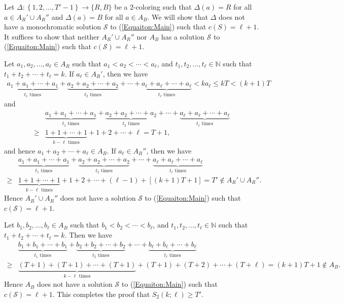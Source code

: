 \documentclass[11pt]{article}
\theoremstyle{definition}
\begin{document}
Let $\Delta:\left\{1,2,\ldots,T'-1\right\}\to\{R,B\}$ be a $2$-coloring such that $\Delta(a)=R$ for all $a\in A_R'\cup A_R''$ and $\Delta(a)=B$ for all $a\in A_B$. We will show that $\Delta$ does not have a monochromatic solution $\mathcal{S}$ to (\ref{Equaiton:Main}) such that $c(S)=\ell+1$. It suffices to show that neither $A_R'\cup A_R''$ nor $A_B$ has a solution $\mathcal{S}$ to (\ref{Equaiton:Main}) such that $c(\mathcal{S})=\ell+1$. 

Let $a_1,a_2,\ldots,a_{\ell}\in A_R$ such that $a_1<a_2<\cdots<a_{\ell}$, and $t_1,t_2,\ldots,t_{\ell}\in\mathbb{N}$ such that $t_1+t_2+\cdots+t_\ell=k$. If $a_\ell\in A_R'$, then we have
\[
\begin{split}
\underbrace{a_1+a_1+\cdots+a_1}_{t_1\text{ times}}+\underbrace{a_2+a_2+\cdots+a_2}_{t_2\text{ times}}+\cdots+\underbrace{a_\ell+a_\ell+\cdots+a_\ell}_{t_\ell\text{ times}}<ka_\ell\leq kT<(k+1)T
\end{split}
\]
and
\[
\begin{split}
&\underbrace{a_1+a_1+\cdots+a_1}_{t_1\text{ times}}+\underbrace{a_2+a_2+\cdots+a_2}_{t_2\text{ times}}+\cdots+\underbrace{a_\ell+a_\ell+\cdots+a_\ell}_{t_\ell\text{ times}}\\\geq&\underbrace{1+1+\cdots+1}_{k-\ell\text{ times}}+1+2+\cdots+\ell=T+1,
\end{split}
\]
and hence $a_1+a_2+\cdots+a_{\ell}\in A_B$. If $a_\ell\in A_R''$, then we have
\[
\begin{split}
&\underbrace{a_1+a_1+\cdots+a_1}_{t_1\text{ times}}+\underbrace{a_2+a_2+\cdots+a_2}_{t_2\text{ times}}+\cdots+\underbrace{a_\ell+a_\ell+\cdots+a_\ell}_{t_\ell\text{ times}}\\\geq&\underbrace{1+1+\cdots+1}_{k-\ell\text{ times}}+1+2+\cdots+(\ell-1)+[(k+1)T+1]=T'\notin A_R'\cup A_R''.
\end{split}
\]
Hence $A_R'\cup A_R''$ does not have a solution $\mathcal{S}$ to (\ref{Equaiton:Main}) such that $c(\mathcal{S})=\ell+1$. 

Let $b_1,b_2,\ldots,b_{\ell}\in A_B$ such that $b_1<b_2<\cdots<b_{\ell}$, and $t_1,t_2,\ldots,t_{\ell}\in\mathbb{N}$ such that $t_1+t_2+\cdots+t_\ell=k$. Then we have
\[
\begin{split}
&\underbrace{b_1+b_1+\cdots+b_1}_{t_1\text{ times}}+\underbrace{b_2+b_2+\cdots+b_2}_{t_2\text{ times}}+\cdots+\underbrace{b_\ell+b_\ell+\cdots+b_\ell}_{t_\ell\text{ times}}\\\geq&\underbrace{(T+1)+(T+1)+\cdots+(T+1)}_{k-\ell\text{ times}}+(T+1)+(T+2)+\cdots+(T+\ell)=(k+1)T+1\notin A_B.
\end{split}
\]
Hence $A_B$ does not have a solution $\mathcal{S}$ to (\ref{Equaiton:Main}) such that $c(\mathcal{S})=\ell+1$. This completes the proof that $S_2(k;\ell)\geq T'$.
\end{document}
